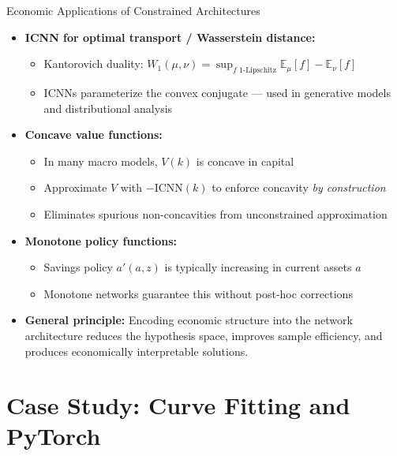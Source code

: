 \documentclass[10pt,english,aspectratio=169]{beamer}
\begin{document}
\begin{frame}{Economic Applications of Constrained Architectures}
\begin{itemize}
\item \textbf{ICNN for optimal transport / Wasserstein distance:}
\begin{itemize}
\item Kantorovich duality: $W_1(\mu,\nu) = \sup_{f \text{ 1-Lipschitz}} \mathbb{E}_\mu[f] - \mathbb{E}_\nu[f]$
\item ICNNs parameterize the convex conjugate --- used in generative models and distributional analysis
\end{itemize}

\medskip
\item \textbf{Concave value functions:}
\begin{itemize}
\item In many macro models, $V(k)$ is concave in capital
\item Approximate $V$ with $-\text{ICNN}(k)$ to enforce concavity \emph{by construction}
\item Eliminates spurious non-concavities from unconstrained approximation
\end{itemize}

\medskip
\item \textbf{Monotone policy functions:}
\begin{itemize}
\item Savings policy $a'(a,z)$ is typically increasing in current assets $a$
\item Monotone networks guarantee this without post-hoc corrections
\end{itemize}

\medskip
\item \textbf{General principle:} Encoding economic structure into the network architecture reduces the hypothesis space, improves sample efficiency, and produces economically interpretable solutions.
\end{itemize}
\end{frame}

\section{Case Study: Curve Fitting and PyTorch}
\end{document}
